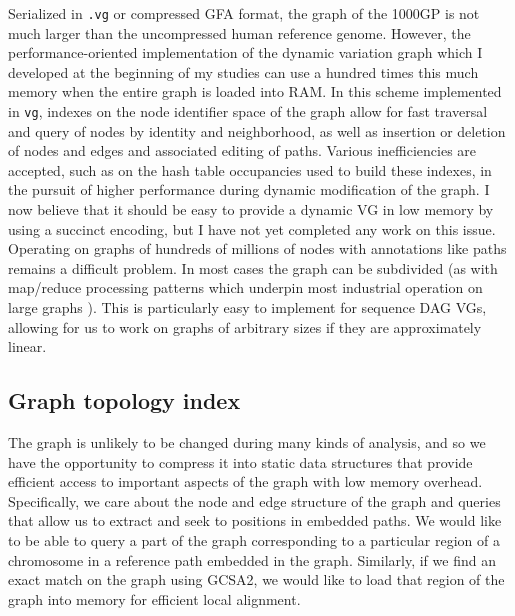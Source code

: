 \documentclass[a4paper,12pt,numbered,oneside]{Classes/PhDThesisPSnPDF}
\begin{document}
Serialized in {\tt .vg} or compressed GFA format, the graph of the 1000GP is not much larger than the uncompressed human reference genome.
However, the performance-oriented implementation of the dynamic variation graph which I developed at the beginning of my studies can use a hundred times this much memory when the entire graph is loaded into RAM.
In this scheme implemented in {\tt vg}, indexes on the node identifier space of the graph allow for fast traversal and query of nodes by identity and neighborhood, as well as insertion or deletion of nodes and edges and associated editing of paths.
Various inefficiencies are accepted, such as on the hash table occupancies used to build these indexes, in the pursuit of higher performance during dynamic modification of the graph.
I now believe that it should be easy to provide a dynamic VG in low memory by using a succinct encoding, but I have not yet completed any work on this issue.
Operating on graphs of hundreds of millions of nodes with annotations like paths remains a difficult problem.
In most cases the graph can be subdivided (as with map/reduce processing patterns \cite{dean2008mapreduce} which underpin most industrial operation on large graphs \cite{cohen2009graph}).
This is particularly easy to implement for sequence DAG VGs, allowing for us to work on graphs of arbitrary sizes if they are approximately linear.

\subsection{Graph topology index}
\label{sec:graph_topology_index}

The graph is unlikely to be changed during many kinds of analysis, and so we have the opportunity to compress it into static data structures that provide efficient access to important aspects of the graph with low memory overhead.
Specifically, we care about the node and edge structure of the graph and queries that allow us to extract and seek to positions in embedded paths.
We would like to be able to query a part of the graph corresponding to a particular region of a chromosome in a reference path embedded in the graph.
Similarly, if we find an exact match on the graph using GCSA2, we would like to load that region of the graph into memory for efficient local alignment.
\end{document}
